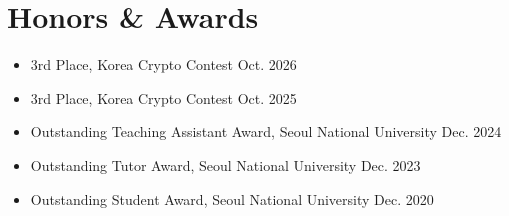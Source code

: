 \documentclass[11pt]{article}
\begin{document}
\section{Honors \& Awards}
\begin{itemize}
\item 3rd Place, Korea Crypto Contest \hfill Oct. 2026
\item 3rd Place, Korea Crypto Contest \hfill Oct. 2025
\item Outstanding Teaching Assistant Award, Seoul National University \hfill Dec. 2024
\item Outstanding Tutor Award, Seoul National University \hfill Dec. 2023
\item Outstanding Student Award, Seoul National University \hfill Dec. 2020
\end{itemize}
\end{document}
